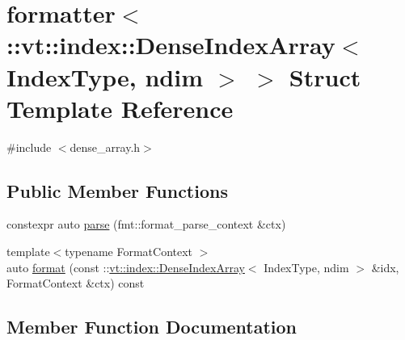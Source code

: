 \hypertarget{structformatter_3_1_1vt_1_1index_1_1_dense_index_array_3_01_index_type_00_01ndim_01_4_01_4}{}\section{formatter$<$\+:\+:vt\+:\+:index\+:\+:Dense\+Index\+Array$<$ Index\+Type, ndim $>$ $>$ Struct Template Reference}
\label{structformatter_3_1_1vt_1_1index_1_1_dense_index_array_3_01_index_type_00_01ndim_01_4_01_4}


{\ttfamily \#include $<$dense\+\_\+array.\+h$>$}

\subsection*{Public Member Functions}
\begin{DoxyCompactItemize}
\item 
constexpr auto \hyperlink{structformatter_3_1_1vt_1_1index_1_1_dense_index_array_3_01_index_type_00_01ndim_01_4_01_4_a4c6f116d85aaac59198a43a89d85a7d0}{parse} (fmt\+::format\+\_\+parse\+\_\+context \&ctx)
\item 
{\footnotesize template$<$typename Format\+Context $>$ }\\auto \hyperlink{structformatter_3_1_1vt_1_1index_1_1_dense_index_array_3_01_index_type_00_01ndim_01_4_01_4_a6b45905f91ae5482bc1c12449a02a955}{format} (const \+::\hyperlink{structvt_1_1index_1_1_dense_index_array}{vt\+::index\+::\+Dense\+Index\+Array}$<$ Index\+Type, ndim $>$ \&idx, Format\+Context \&ctx) const
\end{DoxyCompactItemize}


\subsection{Member Function Documentation}
\mbox{\label{structformatter_3_1_1vt_1_1index_1_1_dense_index_array_3_01_index_type_00_01ndim_01_4_01_4_a6b45905f91ae5482bc1c12449a02a955}} 
